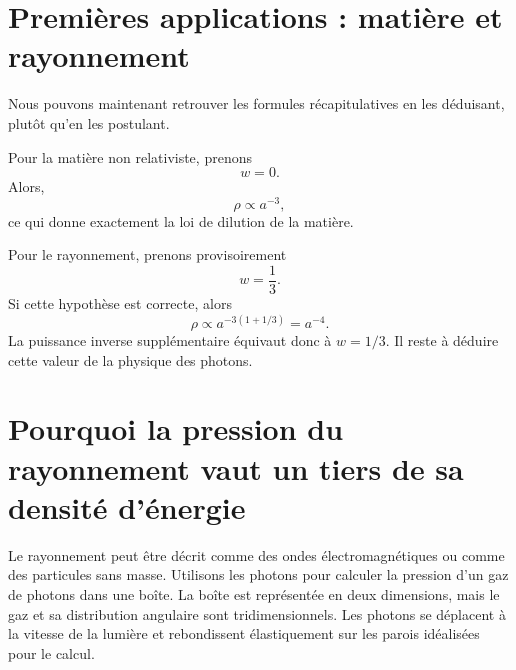 \section{Premières applications : matière et rayonnement}

Nous pouvons maintenant retrouver les formules récapitulatives en les déduisant, plutôt qu’en les postulant.

Pour la matière non relativiste, prenons
\begin{equation}
w=0.
\end{equation}
Alors,
\begin{equation}
\rho\propto a^{-3},
\end{equation}
ce qui donne exactement la loi de dilution de la matière.

Pour le rayonnement, prenons provisoirement
\begin{equation}
w=\frac13.
\end{equation}
Si cette hypothèse est correcte, alors
\begin{equation}
\rho\propto a^{-3(1+1/3)}=a^{-4}.
\end{equation}
La puissance inverse supplémentaire équivaut donc à \(w=1/3\). Il reste à déduire cette valeur de la physique des photons.

\section{Pourquoi la pression du rayonnement vaut un tiers de sa densité d’énergie}

Le rayonnement peut être décrit comme des ondes électromagnétiques ou comme des particules sans masse. Utilisons les photons pour calculer la pression d’un gaz de photons dans une boîte. La boîte est représentée en deux dimensions, mais le gaz et sa distribution angulaire sont tridimensionnels. Les photons se déplacent à la vitesse de la lumière et rebondissent élastiquement sur les parois idéalisées pour le calcul.

